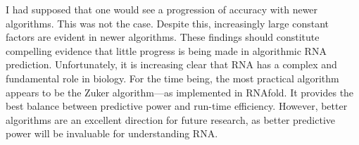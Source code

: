 \documentclass[12pt, a4paper]{article}
\begin{document}
I had supposed that one would see a progression of accuracy with newer algorithms. This was not the case. Despite this, increasingly large constant factors are evident in newer algorithms. These findings should constitute compelling evidence that little progress is being made in algorithmic RNA prediction. Unfortunately, it is increasing clear that RNA has a complex and fundamental role in biology. For the time being, the most practical algorithm appears to be the Zuker algorithm---as implemented in RNAfold. It provides the best balance between predictive power and run-time efficiency. However, better algorithms are an excellent direction for future research, as better predictive power will be invaluable for understanding RNA.





\end{document}
